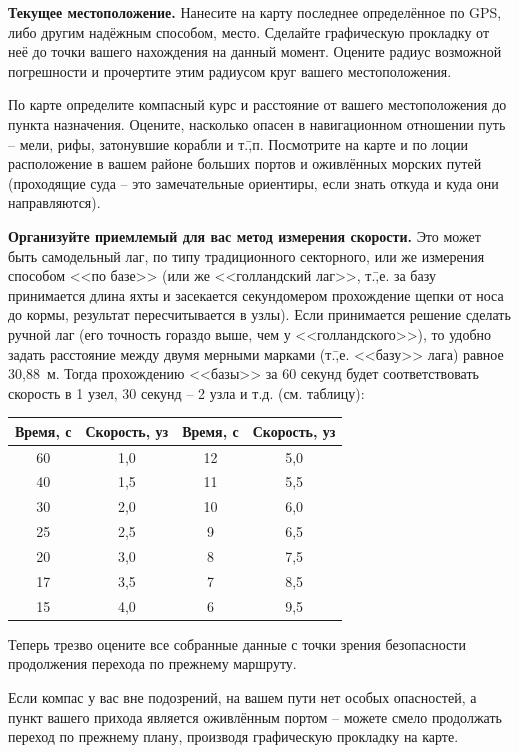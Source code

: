 \documentclass[a4paper, 12pt, twoside, final, book, russian, fittopage, cyremdash]{ncc}
\begin{document}
\textbf{Текущее местоположение.} Нанесите на карту последнее определённое по GPS, либо другим надёжным способом, место. Сделайте графическую прокладку от неё до точки вашего нахождения на данный момент. Оцените радиус возможной погрешности и прочертите этим радиусом круг вашего местоположения. 

По карте определите компасный курс и расстояние от вашего местоположения до пункта назначения. Оцените, насколько опасен в навигационном отношении путь \--- мели, рифы, затонувшие корабли и т.\=,п. Посмотрите на карте и по лоции расположение в вашем районе больших портов и оживлённых морских путей (проходящие суда \--- это замечательные ориентиры, если знать откуда и куда они направляются). 

\textbf{Организуйте приемлемый для вас метод измерения скорости.} Это может быть самодельный лаг, по типу традиционного секторного, или же измерения способом <<по базе>> (или же <<голландский лаг>>, т.\=,е. за базу принимается длина яхты и засекается секундомером прохождение щепки от носа до кормы, результат пересчитывается в узлы). Если принимается решение сделать ручной лаг (его точность гораздо выше, чем у <<голландского>>), то удобно задать расстояние между двумя мерными марками (т.\=,е. <<базу>> лага) равное 30,88~м. Тогда прохождению <<базы>> за 60 секунд будет соответствовать скорость в 1 узел, 30 секунд \--- 2 узла и т.д. (см. таблицу):

\begin{longtable}{c|c||c|c}
  \toprule
  Время, с & Скорость, уз & Время, с & Скорость, уз \\
  \midrule
  60 & 1,0 & 12 & 5,0 \\
  40 & 1,5 & 11 & 5,5 \\
  30 & 2,0 & 10 & 6,0 \\
  25 & 2,5 & 9  & 6,5 \\
  20 & 3,0 & 8  & 7,5 \\
  17 & 3,5 & 7  & 8,5 \\
  15 & 4,0 & 6  & 9,5 \\
  \bottomrule
\end{longtable}

Теперь трезво оцените все собранные данные с точки зрения безопасности продолжения перехода по прежнему маршруту. 

Если компас у вас вне подозрений, на вашем пути нет особых опасностей, а пункт вашего прихода является оживлённым портом \--- можете смело продолжать переход по прежнему плану, производя графическую прокладку на карте. 
\end{document}
